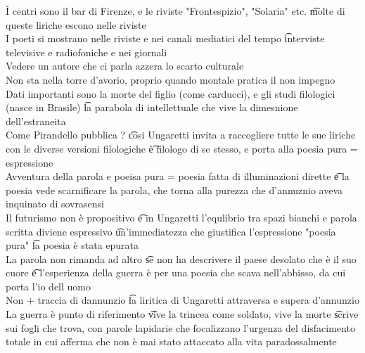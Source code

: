 \documentclass[12pt]{article}
\begin{document}
\v

I centri sono il bar di Firenze, e le riviste "Frontespizio", "Solaria" etc. \t molte di queste liriche escono nelle riviste \\
I poeti si mostrano nelle riviste e nei canali mediatici del tempo \t interviste televisive e radiofoniche e nei giornali \\
Vedere un autore che ci parla azzera lo scarto culturale \\
Non sta nella torre d'avorio, proprio quando montale pratica il non impegno \\

\s[Ungaretti]
Dati importanti sono la morte del figlio (come carducci), e gli studi filologici (nasce in Brasile) \t la parabola di intellettuale che vive la dimesnione dell'estraneita \\
Come Pirandello pubblica ? \t cosi Ungaretti invita a raccogliere tutte le sue liriche con le diverse versioni filologiche \t è filologo di se stesso, e porta alla poesia pura = espressione \\
Avventura della parola e poeisa pura = poesia fatta di illuminazioni dirette \t e la poesia vede scarnificare la parola, che torna alla purezza che d'annuznio aveva inquinato di sovrasensi \\
Il futurismo non è propositivo \t e in Ungaretti l'equlibrio tra spazi bianchi e parola scritta diviene espressivo \t un'immediatezza che giustifica l'espressione "poesia pura" \t la poesia è stata epurata \\
La parola non rimanda ad altro \t se non ha descrivere il paese desolato che è il suo cuore \t e l'esperienza della guerra è per una poesia che scava nell'abbisso, da cui porta l'io dell uomo \\
Non + traccia di dannunzio \t la liritica di Ungaretti attraversa e supera d'annunzio \\
La guerra è punto di riferimento \t vive la trincea come soldato, vive la morte \t scrive sui fogli che trova, con parole lapidarie che focalizzano l'urgenza del disfacimento totale in cui afferma che non è mai stato attaccato alla vita paradossalmente
\end{document}
